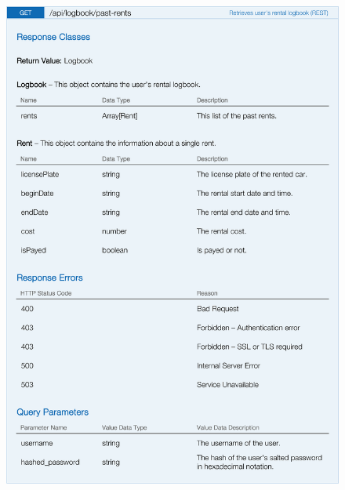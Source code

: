 \begin{figure}[H]
	\noindent
    	\centering 
    	\includegraphics{apitables/APIPastRents.png}
    	\label{fig:api-past-rents}
\end{figure}

